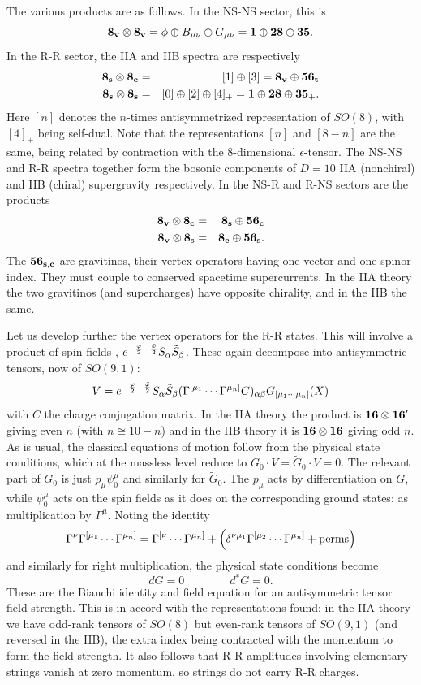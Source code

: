\documentclass[12pt]{article}
\def\be{\begin{equation}}
\def\ee{\end{equation}}
\def\bea{\begin{eqnarray}}
\def\eea{\end{eqnarray}}
\begin{document}
The various products are as follows.  In the NS-NS sector,
this is
\be
{\bf 8_v} \otimes {\bf 8_v} = \phi \oplus B_{\mu\nu} \oplus G_{\mu\nu}
={\bf 1} \oplus {\bf 28}  \oplus {\bf 35} .
\ee
In the R-R sector, the IIA and IIB spectra are respectively
\bea
{\bf 8_s} \otimes {\bf 8_c} &=& [1] \oplus [3] = {\bf 8_v} \oplus
{\bf 56_t} \nonumber\\
{\bf 8_s} \otimes {\bf 8_s} &=& [0] \oplus [2] \oplus [4]_+
= {\bf 1} \oplus {\bf 28}  \oplus {\bf 35}_+ .
\eea
Here $[n]$ denotes the $n$-times antisymmetrized representation of
$SO(8)$, with $[4]_+$ being self-dual.  Note that the representations
$[n]$ and $[8-n]$ are the same, being related by contraction with the
8-dimensional $\epsilon$-tensor.
The NS-NS and R-R spectra
together form the bosonic components of $D=10$ IIA (nonchiral) and IIB
(chiral) supergravity respectively.  In the NS-R and R-NS sectors are
the products
\bea
{\bf 8_v} \otimes {\bf 8_c} &=& 
{\bf 8_s}\oplus{\bf 56_c} \nonumber\\
{\bf 8_v} \otimes {\bf 8_s} &=&
{\bf 8_c}\oplus{\bf 56_s}.
\eea
The $\bf 56_{s,c}$ are gravitinos, their vertex operators having one
vector and one spinor index.  They must couple to conserved spacetime
supercurrents.  In the IIA theory the two gravitinos (and
supercharges) have opposite chirality, and in the IIB the same.

Let us develop further the vertex operators for the R-R states.  
This will involve a product of spin fields \cite{fms},
$e^{-{{\varphi}\over{2}} - {{\tilde{\varphi}}\over{2}} } S_{\alpha}
\tilde{S}_{\beta}$.  These again decompose into antisymmetric tensors, now
of $SO(9,1)$: 
\be
V = e^{ -{{\varphi}\over{2}} - {{\tilde{\varphi}}\over{2}} } S_{\alpha} 
\tilde{S}_{\beta}
( \Gamma^{[\mu_1} \cdots \Gamma^{\mu_n]}C)_{\alpha\beta} G_{[\mu_1 \cdots
\mu_n]}(X) \label{rrver}
\ee
with $C$ the charge conjugation matrix.  In the IIA theory the
product is ${\bf 16} \otimes {\bf 16'}$ giving even $n$ (with $n \cong
10-n$) and in the IIB theory it is ${\bf 16} \otimes {\bf 16}$ giving odd
$n$.
As is usual, the classical equations of motion follow from the 
physical state conditions, which at the massless level reduce to
$G_0 \cdot V = \tilde{G}_0 \cdot V = 0.$
The relevant part of $G_0$ is just $p_\mu \psi^\mu_0$ and similarly for
$\tilde G_0$.  The $p_\mu$ acts by differentiation on $G$, while
$\psi_0^\mu$ acts on the spin fields as it does on the corresponding
ground states: as multiplication by $\Gamma^\mu$.  Noting the identity
\be
\Gamma^\nu \Gamma^{[\mu_1} \cdots \Gamma^{\mu_n]} =
\Gamma^{[\nu} \cdots \Gamma^{\mu_n]} +
\left( \delta^{\nu\mu_1} \Gamma^{[\mu_2} \cdots \Gamma^{\mu_n]}
+ {\rm perms} \right)  \label{gamma}
\ee
and similarly for right multiplication, the physical state conditions
become
\be
dG=0 \qquad\qquad d{}^* G = 0.
\ee
These are the Bianchi identity and field equation for an antisymmetric
tensor field strength.  This is in accord with the representations found:
in the IIA theory we have odd-rank tensors of $SO(8)$ but even-rank
tensors of $SO(9,1)$ (and reversed in the IIB), the extra index being
contracted with the momentum to form the field strength.
It also follows that R-R amplitudes involving elementary strings vanish
at zero momentum, so strings do not carry R-R charges.
\end{document}
